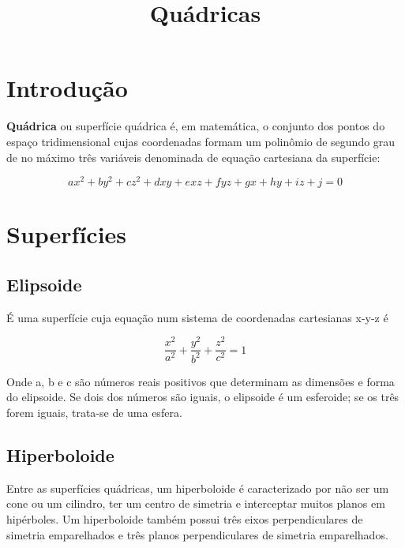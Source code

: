 \documentclass[12 pt, a4 paper]{article}
\title{Quádricas}
\date{}
\begin{document}
\maketitle

\newpage

\tableofcontents

\newpage

\section{Introdução}

\textbf{Quádrica} ou superfície quádrica é, em matemática, o conjunto dos pontos do espaço tridimensional cujas coordenadas formam um polinômio de segundo grau de no máximo três variáveis denominada de equação cartesiana da superfície: 
\begin{center}

\begin{equation}
ax^2+by^2+cz^2+dxy+exz+fyz+gx+hy+iz+j=0
\end{equation}

\end{center}


\section{Superfícies}
\subsection{Elipsoide}
É uma superfície cuja equação num sistema de coordenadas cartesianas x-y-z é
\begin{center}

\begin{equation}
\dfrac{x^2}{a^2} + \dfrac{y^2}{b^2} + \dfrac{z^2}{c^2} = 1
\end{equation}

\end{center}

Onde a, b e c são números reais positivos que determinam as dimensões e forma do elipsoide. Se dois dos números são iguais, o elipsoide é um esferoide; se os três forem iguais, trata-se de uma esfera.

\subsection{Hiperboloide}
 Entre as superfícies quádricas, um hiperboloide é caracterizado por não ser um cone ou um cilindro, ter um centro de simetria e interceptar muitos planos em hipérboles. Um hiperboloide também possui três eixos perpendiculares de simetria emparelhados e três planos perpendiculares de simetria emparelhados.
 
\end{document}
